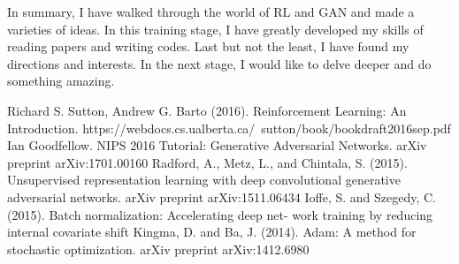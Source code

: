 \documentclass[10pt,twocolumn,letterpaper]{article}
\begin{document}
In summary, I have walked through the world of RL and GAN and made a varieties of ideas.  In this training stage, I have 
greatly developed my skills of reading papers and writing codes. Last but not the least, I have found my directions and 
interests. In the next stage, I would like to delve deeper and do something amazing.

\begin{thebibliography}{99}
 Richard S. Sutton, Andrew G. Barto (2016). Reinforcement Learning: An Introduction. https://webdocs.cs.ualberta.ca/~sutton/book/bookdraft2016sep.pdf
 Ian Goodfellow. NIPS 2016 Tutorial: Generative Adversarial Networks. arXiv preprint arXiv:1701.00160
  Radford, A., Metz, L., and Chintala, S. (2015). Unsupervised representation learning with deep convolutional generative adversarial networks. arXiv preprint arXiv:1511.06434
 Ioffe, S. and Szegedy, C. (2015). Batch normalization: Accelerating deep net- work training by reducing internal covariate shift
 Kingma, D. and Ba, J. (2014). Adam: A method for stochastic optimization. arXiv preprint arXiv:1412.6980
\end{thebibliography}

{\small


}
\end{document}
